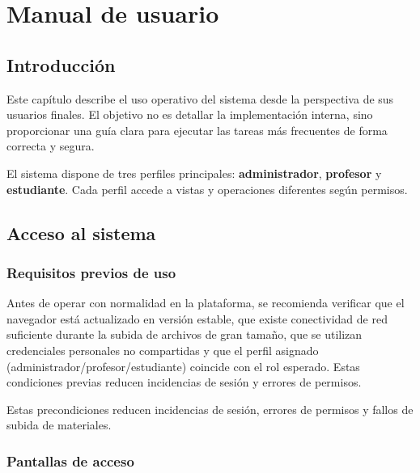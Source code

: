 \chapter{Manual de usuario}\label{manual}
\makeatletter
{}
\makeatother

\FloatBarrier
\section{Introducci\'on}

Este cap\'itulo describe el uso operativo del sistema desde la perspectiva de sus
usuarios finales. El objetivo no es detallar la implementaci\'on interna,
sino proporcionar una gu\'ia clara para ejecutar las tareas m\'as frecuentes
de forma correcta y segura.

El sistema dispone de tres perfiles principales:
\textbf{administrador}, \textbf{profesor} y \textbf{estudiante}.
Cada perfil accede a vistas y operaciones diferentes seg\'un permisos.

\FloatBarrier
\section{Acceso al sistema}

\subsection{Requisitos previos de uso}

Antes de operar con normalidad en la plataforma, se recomienda verificar que el navegador est\'a actualizado en versi\'on estable, que existe conectividad de red suficiente durante la subida de archivos de gran tama\~no, que se utilizan credenciales personales no compartidas y que el perfil asignado (administrador/profesor/estudiante) coincide con el rol esperado. Estas condiciones previas reducen incidencias de sesi\'on y errores de permisos.

Estas precondiciones reducen incidencias de sesi\'on,
errores de permisos y fallos de subida de materiales.

\subsection{Pantallas de acceso}

